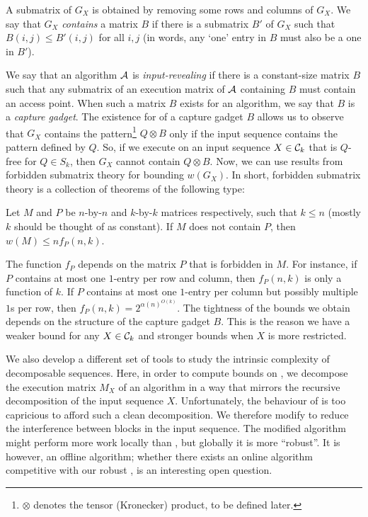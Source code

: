 A submatrix of $G_X$ is obtained by removing some rows and columns of $G_X$.
We say that $G_X$ \emph{contains} a matrix $B$ if there is a submatrix $B'$ of $G_X$ such that $B(i,j) \leq B'(i,j)$ for all $i,j$ (in words, any `one' entry in $B$ must also be a one in $B'$).
 
We say that an algorithm ${\mathcal{A}}$ is {\em input-revealing} if there is a constant-size matrix $B$ such that any submatrix of an execution matrix of ${\mathcal{A}}$ containing $B$ must contain an access point. 
When such a matrix $B$ exists for an algorithm, we say that $B$ is a {\em capture gadget}.  
The existence for \greedy of a capture gadget $B$ allows us to observe that $G_X$ contains the pattern\footnote{$\otimes$ denotes the tensor (Kronecker) product, to be defined later.} $Q \otimes B$ only if the input sequence contains the pattern defined by $Q$. 
So, if we execute \greedy on an input sequence $X \in {\mathcal{C}}_k$ that is $Q$-free for $Q \in S_k$, then $G_X$ cannot contain $Q \otimes B$.  
Now, we can use results from forbidden submatrix theory for bounding $w(G_X)$. 
In short, forbidden submatrix theory is a collection of theorems of the following type: 

\begin{theorem} 
Let $M$ and $P$ be $n$-by-$n$ and $k$-by-$k$ matrices respectively, such that $k \leq n$ (mostly $k$ should be thought of as constant).  
If $M$ does not contain $P$, then $w(M) \leq n f_P(n,k)$.
\end{theorem} 

The function $f_P$ depends on the matrix $P$ that is forbidden in $M$.  
For instance, if $P$ contains at most one $1$-entry per row and column, then $f_P(n,k)$ is only a function of $k$.  
If $P$ contains at most one $1$-entry per column but possibly multiple $1$s per row, then $f_P(n,k) = 2^{\alpha(n)^{O(k)}}$. 
The tightness of the bounds we obtain depends on the structure of the capture gadget $B$. 
This is the reason we have a weaker bound for any $X \in {\mathcal{C}}_k$ and stronger bounds when $X$ is more restricted.    
 
We also develop a different set of tools to study the intrinsic complexity of decomposable sequences. Here, in order to compute bounds on \opt, we decompose the execution matrix $M_X$ of an algorithm in a way that mirrors the recursive decomposition of the input sequence $X$. Unfortunately, the behaviour of \greedy is too capricious to afford such a clean decomposition. We therefore modify \greedy to reduce the interference between blocks in the input sequence. The modified algorithm might perform more work locally than \greedy, but globally it is more ``robust''. It is however, an offline algorithm; whether there exists an online algorithm competitive with our robust \greedy, is an interesting open question.


